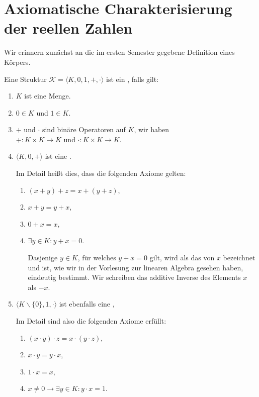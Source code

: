 \section{Axiomatische Charakterisierung der reellen Zahlen}
Wir erinnern zunächst an die im ersten Semester gegebene Definition eines Körpers. 
\begin{Definition}[Körper]
Eine Struktur $\mathcal{K} = \langle K, 0, 1, +, \cdot \rangle$ ist ein , falls gilt:
\begin{enumerate}
\item $K$ ist eine Menge.
\item $0 \in K$ und $1 \in K$.
\item $+$ und $\cdot$ sind binäre Operatoren auf $K$, wir haben
      \\[0.2cm]
      \hspace*{1.3cm}
      $+: K \times K \rightarrow K$ \quad und \quad $\cdot: K \times K \rightarrow K$.      
\item $\langle K, 0, + \rangle$ ist eine .
      
      Im Detail heißt dies, dass die folgenden Axiome gelten:
      \begin{enumerate}
        \item $(x + y) + z = x + (y + z)$,
        \item $x + y = y + x$,
        \item $0 + x = x$,
        \item $\exists y \in K: y + x = 0$.

              Dasjenige $y \in K$, für welches $y + x = 0$ gilt, wird als das  von $x$ 
              bezeichnet und ist, wie wir in der Vorlesung zur linearen Algebra gesehen haben,
              eindeutig bestimmt.  Wir schreiben das additive Inverse des Elements $x$ als $-x$. 
        \end{enumerate}
\item $\langle K \backslash \{ 0 \}, 1, \cdot \rangle$ ist ebenfalls eine ,

      Im Detail sind also die folgenden Axiome erfüllt:
      \begin{enumerate}
      \item $(x \cdot y) \cdot z = x \cdot (y \cdot z)$,
      \item $x \cdot y = y \cdot x$,
      \item $1 \cdot x = x$,
      \item $x \not= 0 \rightarrow \exists y \in K: y \cdot x = 1$.


\end{enumerate}
\end{enumerate}
\end{Definition}
